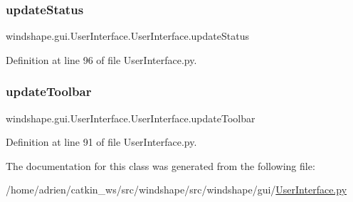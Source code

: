 \subsubsection{\texorpdfstring{update\+Status}{updateStatus}}
{\footnotesize\ttfamily windshape.\+gui.\+User\+Interface.\+User\+Interface.\+update\+Status}



Definition at line 96 of file User\+Interface.\+py.

\mbox{\label{classwindshape_1_1gui_1_1_user_interface_1_1_user_interface_a9bbcee98312724b747f07c2e8305ebb6}} 
\subsubsection{\texorpdfstring{update\+Toolbar}{updateToolbar}}
{\footnotesize\ttfamily windshape.\+gui.\+User\+Interface.\+User\+Interface.\+update\+Toolbar}



Definition at line 91 of file User\+Interface.\+py.



The documentation for this class was generated from the following file\+:\begin{DoxyCompactItemize}
\item 
/home/adrien/catkin\+\_\+ws/src/windshape/src/windshape/gui/\mbox{\hyperlink{_user_interface_8py}{User\+Interface.\+py}}\end{DoxyCompactItemize}
